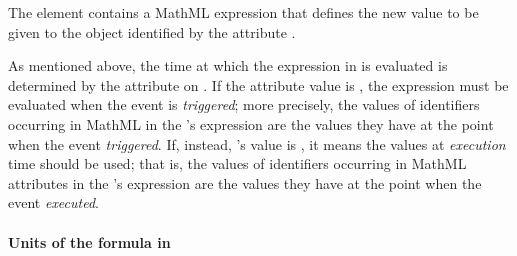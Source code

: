 The  element contains a MathML expression that defines
the new value to be given to the object identified by the
\EventAssignment attribute .

As mentioned above, the time at which the expression in
 is evaluated is determined by the attribute
 on \Event.  If the attribute
value is , the expression must be evaluated when the
event is \emph{triggered}; more precisely, the values of identifiers
occurring in MathML   in the
\EventAssignment's  expression are the values they
have at the point when the event \emph{triggered}.  If, instead,
's value is , it means
the values at \emph{execution} time should be used; that is, the
values of identifiers occurring in MathML  attributes in
the \EventAssignment's  expression are the values they
have at the point when the event \emph{executed}.



\paragraph{Units of the  formula in }


